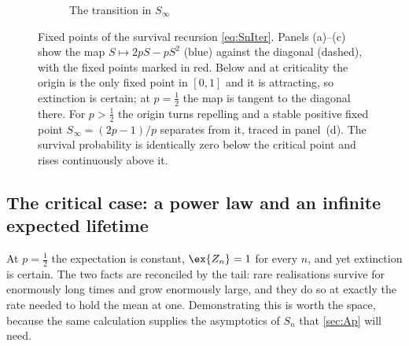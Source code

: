 \begin{figure}[htbp]
    \vspace{10pt}
    \begin{subfigure}[b]{0.55\textwidth}
    \centering
    \caption{The transition in $S_\infty$}
    \end{subfigure}

    \caption{Fixed points of the survival recursion \cref{eq:SnIter}. Panels
    (a)--(c) show the map $S\mapsto 2pS-pS^2$ (blue) against the diagonal (dashed),
    with the fixed points marked in red. Below and at criticality the origin is the
    only fixed point in $[0,1]$ and it is attracting, so extinction is certain; at
    $p=\tfrac12$ the map is tangent to the diagonal there. For $p>\tfrac12$ the
    origin turns repelling and a stable positive fixed point $S_\infty=(2p-1)/p$
    separates from it, traced in panel~(d). The survival probability is identically
    zero below the critical point and rises continuously above it.}
    \label{fig:phase_transition}
\end{figure}

\subsection{The critical case: a power law and an infinite expected lifetime}
\label{sec:criticalcase}

At $p=\tfrac12$ the expectation is constant, $\ex{Z_n}=1$ for every $n$, and yet
extinction is certain. The two facts are reconciled by the tail: rare realisations
survive for enormously long times and grow enormously large, and they do so at
exactly the rate needed to hold the mean at one. Demonstrating this is worth the
space, because the same calculation supplies the asymptotics of $S_n$ that
\cref{sec:Ap} will need.

